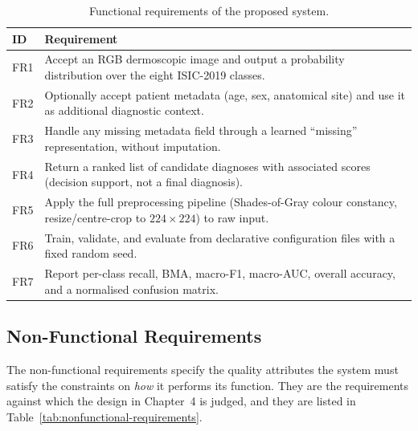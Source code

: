 \begin{table}[h]
\centering
\caption{Functional requirements of the proposed system.}
\label{tab:functional-requirements}
\begin{tabular}{p{}p{}}
\toprule
ID & Requirement \\
\midrule
FR1 & Accept an RGB dermoscopic image and output a probability distribution over the eight ISIC-2019 classes. \\
FR2 & Optionally accept patient metadata (age, sex, anatomical site) and use it as additional diagnostic context. \\
FR3 & Handle any missing metadata field through a learned ``missing'' representation, without imputation. \\
FR4 & Return a ranked list of candidate diagnoses with associated scores (decision support, not a final diagnosis). \\
FR5 & Apply the full preprocessing pipeline (Shades-of-Gray colour constancy, resize/centre-crop to $224\times224$) to raw input. \\
FR6 & Train, validate, and evaluate from declarative configuration files with a fixed random seed. \\
FR7 & Report per-class recall, BMA, macro-F1, macro-AUC, overall accuracy, and a normalised confusion matrix. \\
\bottomrule
\end{tabular}
\end{table}

\subsection{Non-Functional Requirements}

The non-functional requirements specify the quality attributes the system
must satisfy the constraints on \emph{how} it performs its function.
They are the requirements against which the design in Chapter~4 is judged,
and they are listed in Table~\ref{tab:nonfunctional-requirements}.

